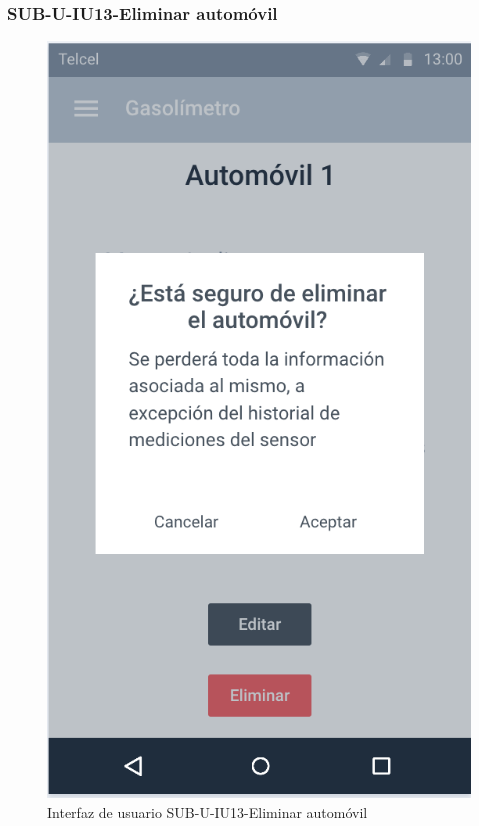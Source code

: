 \subsubsection{SUB-U-IU13-Eliminar automóvil}\label{SUB-U-IU13}
\begin{figure}[H]
	\centering
	\includegraphics[scale=1]{Capitulo4/software/submodulos/usuarios/images/sub-u-iu13}
	\caption{Interfaz de usuario SUB-U-IU13-Eliminar automóvil}
	\label{fig:sub-u-iu13}
\end{figure}